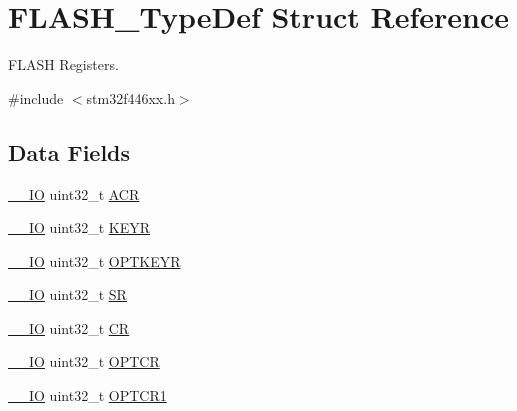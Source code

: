 \hypertarget{struct_f_l_a_s_h___type_def}{}\section{F\+L\+A\+S\+H\+\_\+\+Type\+Def Struct Reference}
\label{struct_f_l_a_s_h___type_def}


F\+L\+A\+SH Registers.  




{\ttfamily \#include $<$stm32f446xx.\+h$>$}

\subsection*{Data Fields}
\begin{DoxyCompactItemize}
\item 
\mbox{\hyperlink{core__sc300_8h_aec43007d9998a0a0e01faede4133d6be}{\+\_\+\+\_\+\+IO}} uint32\+\_\+t \mbox{\hyperlink{struct_f_l_a_s_h___type_def_a9cb55206b29a8c16354747c556ab8bea}{A\+CR}}
\item 
\mbox{\hyperlink{core__sc300_8h_aec43007d9998a0a0e01faede4133d6be}{\+\_\+\+\_\+\+IO}} uint32\+\_\+t \mbox{\hyperlink{struct_f_l_a_s_h___type_def_a84c491be6c66b1d5b6a2efd0740b3d0c}{K\+E\+YR}}
\item 
\mbox{\hyperlink{core__sc300_8h_aec43007d9998a0a0e01faede4133d6be}{\+\_\+\+\_\+\+IO}} uint32\+\_\+t \mbox{\hyperlink{struct_f_l_a_s_h___type_def_afc4900646681dfe1ca43133d376c4423}{O\+P\+T\+K\+E\+YR}}
\item 
\mbox{\hyperlink{core__sc300_8h_aec43007d9998a0a0e01faede4133d6be}{\+\_\+\+\_\+\+IO}} uint32\+\_\+t \mbox{\hyperlink{struct_f_l_a_s_h___type_def_af6aca2bbd40c0fb6df7c3aebe224a360}{SR}}
\item 
\mbox{\hyperlink{core__sc300_8h_aec43007d9998a0a0e01faede4133d6be}{\+\_\+\+\_\+\+IO}} uint32\+\_\+t \mbox{\hyperlink{struct_f_l_a_s_h___type_def_ab40c89c59391aaa9d9a8ec011dd0907a}{CR}}
\item 
\mbox{\hyperlink{core__sc300_8h_aec43007d9998a0a0e01faede4133d6be}{\+\_\+\+\_\+\+IO}} uint32\+\_\+t \mbox{\hyperlink{struct_f_l_a_s_h___type_def_acfef9b6d7da4271943edc04d7dfdf595}{O\+P\+T\+CR}}
\item 
\mbox{\hyperlink{core__sc300_8h_aec43007d9998a0a0e01faede4133d6be}{\+\_\+\+\_\+\+IO}} uint32\+\_\+t \mbox{\hyperlink{struct_f_l_a_s_h___type_def_a1dddf235f246a1d4e7e5084cd51e2dd0}{O\+P\+T\+C\+R1}}
\end{DoxyCompactItemize}


